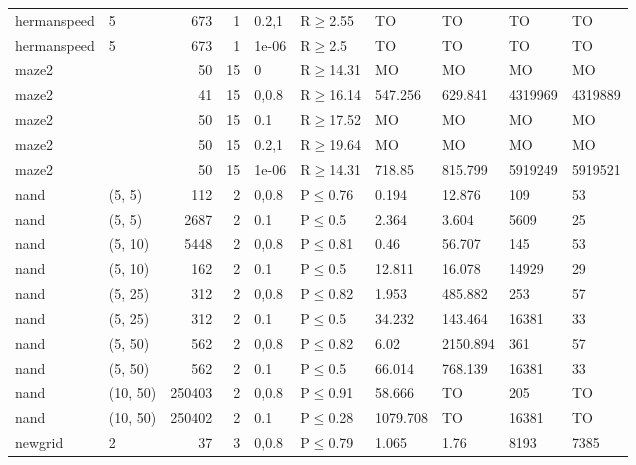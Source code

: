 \begin{longtable}{llrrllllll}
 hermanspeed   & 5        &    	673 &   1 & 0.2,1 & R$\geq$2.55  & TO       & TO       & TO      & TO      \\
 hermanspeed   & 5        &    	673 &   1 & 1e-06 & R$\geq$2.5   & TO       & TO       & TO      & TO      \\
 maze2         &          &     	50 &  15 & 0     & R$\geq$14.31 & MO       & MO       & MO      & MO      \\
 maze2         &          &     	41 &  15 & 0,0.8 & R$\geq$16.14 & 547.256  & 629.841  & 4319969 & 4319889 \\
 maze2         &          &     	50 &  15 & 0.1   & R$\geq$17.52 & MO       & MO       & MO      & MO      \\
 maze2         &          &     	50 &  15 & 0.2,1 & R$\geq$19.64 & MO       & MO       & MO      & MO      \\
 maze2         &          &     	50 &  15 & 1e-06 & R$\geq$14.31 & 718.85   & 815.799  & 5919249 & 5919521 \\
 nand          & (5, 5)   &    	112 &   2 & 0,0.8 & P$\leq$0.76  & 0.194    & 12.876   & 109     & 53      \\
 nand          & (5, 5)   &   	2687 &   2 & 0.1   & P$\leq$0.5   & 2.364    & 3.604    & 5609    & 25      \\
 nand          & (5, 10)  &   	5448 &   2 & 0,0.8 & P$\leq$0.81  & 0.46     & 56.707   & 145     & 53      \\
 nand          & (5, 10)  &    	162 &   2 & 0.1   & P$\leq$0.5   & 12.811   & 16.078   & 14929   & 29      \\
 nand          & (5, 25)  &    	312 &   2 & 0,0.8 & P$\leq$0.82  & 1.953    & 485.882  & 253     & 57      \\
 nand          & (5, 25)  &    	312 &   2 & 0.1   & P$\leq$0.5   & 34.232   & 143.464  & 16381   & 33      \\
 nand          & (5, 50)  &    	562 &   2 & 0,0.8 & P$\leq$0.82  & 6.02     & 2150.894 & 361     & 57      \\
 nand          & (5, 50)  &    	562 &   2 & 0.1   & P$\leq$0.5   & 66.014   & 768.139  & 16381   & 33      \\
 nand          & (10, 50) & 	250403 &   2 & 0,0.8 & P$\leq$0.91  & 58.666   & TO       & 205     & TO      \\
 nand          & (10, 50) & 	250402 &   2 & 0.1   & P$\leq$0.28  & 1079.708 & TO       & 16381   & TO      \\
 newgrid       & 2        &     	37 &   3 & 0,0.8 & P$\leq$0.79  & 1.065    & 1.76     & 8193    & 7385    \\

\end{longtable}
